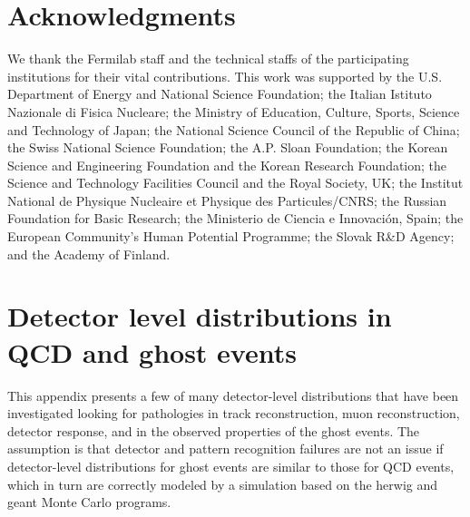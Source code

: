 \documentclass[aps,prd,preprint,floatfix,nofootinbib,superscriptaddress,showpacs,amssymb]{revtex4}
\begin{document}
 \section{Acknowledgments}
  We thank the Fermilab staff and the technical staffs of the participating
  institutions for their vital contributions. This work was supported by the
  U.S. Department of Energy and National Science Foundation; 
  the Italian Istituto Nazionale di Fisica Nucleare; the Ministry of Education,
  Culture, Sports, Science and Technology of Japan;  the National Science Council of the
  Republic of China; the Swiss National Science Foundation; the A.P. Sloan 
  Foundation; 
  the Korean Science and Engineering Foundation and the Korean Research 
  Foundation; the Science and Technology Facilities Council and the Royal
  Society, UK;  the Institut National de Physique Nucleaire et Physique
  des Particules/CNRS; the Russian Foundation for Basic Research; 
  the Ministerio de Ciencia e Innovaci\'{o}n, Spain; the European Community's
  Human Potential Programme; the Slovak R\&D Agency;
  and the Academy of Finland.
\appendix
\section{Detector level distributions in QCD and ghost events}
 This appendix presents a few of many detector-level distributions that
 have been investigated looking for pathologies in track reconstruction,
 muon reconstruction, detector response, and in the observed properties
 of the ghost events. The assumption is that detector and pattern 
 recognition failures are not an issue if detector-level distributions
 for ghost events are similar to those for QCD events, which in turn
 are correctly modeled by a simulation based on the {\sc herwig} and 
 {\sc geant} Monte Carlo programs. 
\end{document}
